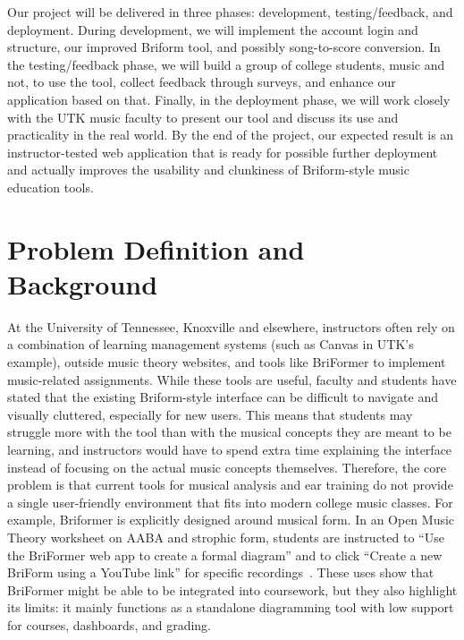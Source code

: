 \documentclass[12pt, letterpaper]{article}
\begin{document}
Our project will be delivered in three phases: development, testing/feedback, and deployment. During development, we will implement the account login and structure, our improved Briform tool, and possibly song-to-score conversion. In the testing/feedback phase, we will build a group of college students, music and not, to use the tool, collect feedback through surveys, and enhance our application based on that. Finally, in the deployment phase, we will work closely with the UTK music faculty to present our tool and discuss its use and practicality in the real world. By the end of the project, our expected result is an instructor-tested web application that is ready for possible further deployment and actually improves the usability and clunkiness of Briform-style music education tools.

\pagestyle{empty}

\tableofcontents
\listoftables
\listoffigures
\newpage

\pagestyle{plain}

\section*{Problem Definition and Background}
At the University of Tennessee, Knoxville and elsewhere, instructors often rely on a combination of learning management systems (such as Canvas in UTK's example), outside music theory websites, and tools like BriFormer to implement music-related assignments. While these tools are useful, faculty and students have stated that the existing Briform-style interface can be difficult to navigate and visually cluttered, especially for new users. This means that students may struggle more with the tool than with the musical concepts they are meant to be learning, and instructors would have to spend extra time explaining the interface instead of focusing on the actual music concepts themselves. Therefore, the core problem is that current tools for musical analysis and ear training do not provide a single user-friendly environment that fits into modern college music classes. For example, Briformer is explicitly designed around musical form. In an Open Music Theory worksheet on AABA and strophic form, students are instructed to ``Use the BriFormer web app to create a formal diagram'' and to click ``Create a new BriForm using a YouTube link'' for specific recordings~\cite{omt-aaba}. These uses show that BriFormer might be able to be integrated into coursework, but they also highlight its limits: it mainly functions as a standalone diagramming tool with low support for courses, dashboards, and grading.
\end{document}
